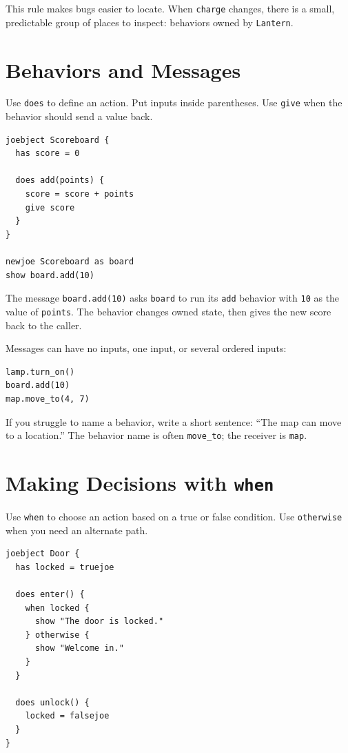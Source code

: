 \documentclass[12pt]{article}
\newcommand{\kw}[1]{\texttt{#1}}
\begin{document}
This rule makes bugs easier to locate. When \kw{charge} changes, there is a small, predictable group of places to inspect: behaviors owned by \kw{Lantern}.

\clearpage
\section{Behaviors and Messages}
Use \kw{does} to define an action. Put inputs inside parentheses. Use \kw{give} when the behavior should send a value back.

\begin{lstlisting}[style=joe]
joebject Scoreboard {
  has score = 0

  does add(points) {
    score = score + points
    give score
  }
}

newjoe Scoreboard as board
show board.add(10)
\end{lstlisting}

The message \kw{board.add(10)} asks \kw{board} to run its \kw{add} behavior with \kw{10} as the value of \kw{points}. The behavior changes owned state, then gives the new score back to the caller.

Messages can have no inputs, one input, or several ordered inputs:

\begin{lstlisting}[style=joe]
lamp.turn_on()
board.add(10)
map.move_to(4, 7)
\end{lstlisting}

\begin{tipbox}
If you struggle to name a behavior, write a short sentence: ``The map can move to a location.'' The behavior name is often \kw{move\_to}; the receiver is \kw{map}.
\end{tipbox}

\clearpage
\section{Making Decisions with \texttt{when}}
Use \kw{when} to choose an action based on a true or false condition. Use \kw{otherwise} when you need an alternate path.

\begin{lstlisting}[style=joe]
joebject Door {
  has locked = truejoe

  does enter() {
    when locked {
      show "The door is locked."
    } otherwise {
      show "Welcome in."
    }
  }

  does unlock() {
    locked = falsejoe
  }
}
\end{lstlisting}
\end{document}
